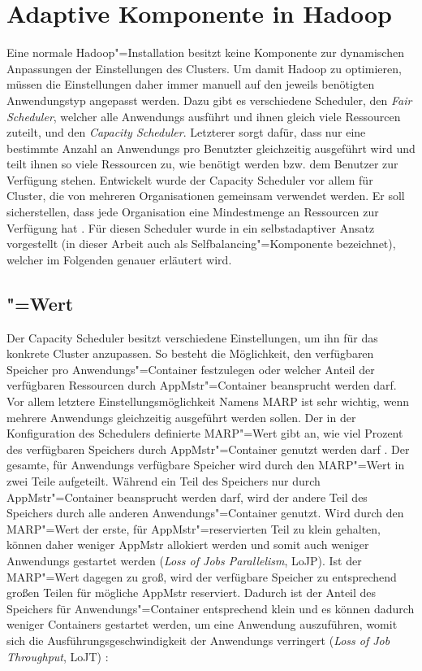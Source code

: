 \section{Adaptive Komponente in Hadoop}
\label{sec:inriaSetting}

Eine normale Hadoop"=Installation besitzt keine Komponente zur dynamischen Anpassungen der Einstellungen des Clusters.
Um damit Hadoop zu optimieren, müssen die Einstellungen daher immer manuell auf den jeweils benötigten Anwendungstyp angepasst werden.
Dazu gibt es \uA verschiedene Scheduler, den \emph{Fair Scheduler}, welcher alle \glspl{Anwendung} ausführt und ihnen gleich viele Ressourcen zuteilt, und den \emph{Capacity Scheduler}.
Letzterer sorgt dafür, dass nur eine bestimmte Anzahl an \glspl{Anwendung} pro Benutzter gleichzeitig ausgeführt wird und teilt ihnen so viele Ressourcen zu, wie benötigt werden bzw. dem Benutzer zur Verfügung stehen.
Entwickelt wurde der Capacity Scheduler vor allem für Cluster, die von mehreren Organisationen gemeinsam verwendet werden.
Er soll sicherstellen, dass jede Organisation eine Mindestmenge an Ressourcen zur Verfügung hat \cite{HadoopCapScheduler271}.
Für diesen Scheduler wurde in \cite{Zhang2016} ein selbstadaptiver Ansatz vorgestellt (in dieser Arbeit auch als Selfbalancing"=Komponente bezeichnet), welcher im Folgenden genauer erläutert wird.

\subsection{"=Wert}
\label{subsec:selfbalancingMarp}

Der Capacity Scheduler besitzt verschiedene Einstellungen, um ihn für das konkrete Cluster anzupassen.
So besteht \zB die Möglichkeit, den verfügbaren Speicher pro Anwendungs"=Container festzulegen oder welcher Anteil der verfügbaren Ressourcen durch \gls{AppMstr}"=Container beansprucht werden darf.
Vor allem letztere Einstellungsmöglichkeit Namens \gls{MARP} ist sehr wichtig, wenn mehrere \glspl{Anwendung} gleichzeitig ausgeführt werden sollen.
Der in der Konfiguration des Schedulers definierte \gls{MARP}"=Wert gibt an, wie viel Prozent des verfügbaren Speichers durch \gls{AppMstr}"=Container genutzt werden darf \cite{HadoopCapScheduler271}.
Der gesamte, für \glspl{Anwendung} verfügbare Speicher wird durch den \gls{MARP}"=Wert in zwei Teile aufgeteilt.
Während ein Teil des Speichers nur durch \gls{AppMstr}"=Container beansprucht werden darf, wird der andere Teil des Speichers durch alle anderen Anwendungs"=Container genutzt.
Wird durch den \gls{MARP}"=Wert der erste, für \gls{AppMstr}"=reservierten Teil zu klein gehalten, können daher weniger \gls{AppMstr} allokiert werden und somit auch weniger \glspl{Anwendung} gestartet werden (\emph{Loss of Jobs Parallelism}, LoJP).
Ist der \gls{MARP}"=Wert dagegen zu groß, wird der verfügbare Speicher zu entsprechend großen Teilen für mögliche \gls{AppMstr} reserviert.
Dadurch ist der Anteil des Speichers für Anwendungs"=Container entsprechend klein und es können dadurch weniger \glspl{Container} gestartet werden, um eine \gls{Anwendung} auszuführen, womit sich die Ausführungsgeschwindigkeit der \glspl{Anwendung} verringert (\emph{Loss of Job Throughput}, LoJT) \cite{Zhang2016}:

